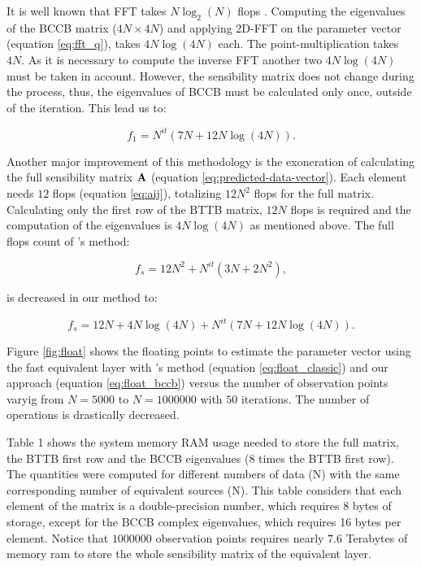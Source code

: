 \documentclass[paper]{geophysics}
\begin{document}
It is well known that FFT takes $N \log_2(N)$ flops \cite[]{brigham1988fast}. Computing the eigenvalues of the BCCB matrix ($4N \times 4N$) and applying 2D-FFT on the parameter vector (equation \ref{eq:fft_q}), takes $4N \log(4N)$ each. The point-multiplication takes $4N$. As it is necessary to compute the inverse FFT another two $4N \log(4N)$ must be taken in account. However, the sensibility matrix does not change during the process, thus, the eigenvalues of BCCB must be calculated only once, outside of the iteration. This lead us to:

\begin{equation}
f_1 = N^{it} (7N + 12N\log(4N)).
\label{eq:float_bccb}
\end{equation}

Another major improvement of this methodology is the exoneration of calculating the full sensibility matrix $\tensor{A}$ (equation \ref{eq:predicted-data-vector}). Each element needs $12$ flops (equation \ref{eq:aij}), totalizing $12N^2$ flops for the full matrix. Calculating only the first row of the BTTB matrix, $12N$ flops is required and the computation of the eigenvalues is $4N \log(4N)$ as mentioned above.
The full flops count of \cite{siqueira2017fast}'s method:

\begin{equation}
f_s = 12N^2 + N^{it} (3N + 2N^2),
\label{eq:float_siqueira}
\end{equation}

is decreased in our method to:

\begin{equation}
f_s = 12N + 4N \log(4N) + N^{it} (7N + 12N\log(4N)).
\label{eq:float_new}
\end{equation}

Figure \ref{fig:float} shows the floating points to estimate the parameter vector using the fast equivalent layer with \cite{siqueira2017fast}'s method (equation \ref{eq:float_classic}) and our approach (equation \ref{eq:float_bccb}) versus the number of observation points varyig from $N = 5000$ to $N = 1000000$ with $50$ iterations. The number of operations is drastically decreased.

Table 1 shows the system memory RAM usage needed to store the full matrix, the BTTB first row and the BCCB eigenvalues ($8$ times the BTTB first row). The quantities were computed for different numbers of data (N) with the same corresponding number of equivalent sources (N). This table considers that each element of the matrix is a double-precision number, which requires 8 bytes of storage, except for the BCCB complex eigenvalues, which requires 16 bytes per element. Notice that $1000000$ observation points requires nearly $7.6$ Terabytes of memory ram to store the whole sensibility matrix of the equivalent layer.
\end{document}
